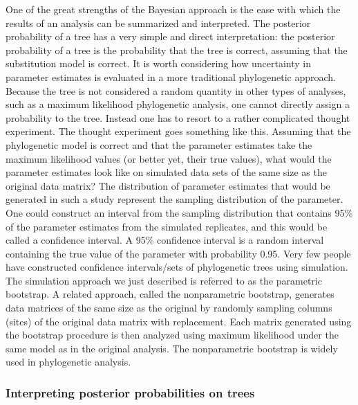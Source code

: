 \documentclass{svmult}
\begin{document}
One of the great strengths of the Bayesian approach is the ease with which the results of an analysis can be summarized and interpreted. The posterior
probability of a tree has a very simple and direct interpretation: the posterior probability of a tree is the probability that the tree is correct, assuming that
the substitution model is correct. 
It is worth considering how uncertainty in parameter estimates is evaluated in a more traditional phylogenetic approach. Because the tree is not considered
a random quantity in other types of analyses, such as a maximum likelihood phylogenetic analysis, one cannot directly assign a probability to the tree.
Instead one has to resort to a rather complicated thought experiment. The thought experiment goes something like this. Assuming that the phylogenetic
model is correct and that the parameter estimates take the maximum likelihood values (or better yet, their true values), what would the parameter estimates look like on simulated data sets
of the same size as the original data matrix? The distribution of parameter estimates that would be generated in such a study represent the sampling
distribution of the parameter. One could construct an interval from the sampling distribution that contains 95\% of the parameter estimates from the simulated replicates, and this
would be called a confidence interval. A 95\% confidence interval is a random interval containing the true value of the parameter with probability
0.95. Very few people have constructed confidence intervals/sets of phylogenetic trees using simulation. The simulation approach we just described
is referred to as the parametric bootstrap. 
A related approach, called the nonparametric bootstrap, generates data matrices of the same size as the original by randomly sampling columns (sites) of the original data matrix with replacement. Each matrix generated using the bootstrap procedure is then analyzed using maximum likelihood under the same model as
in the original analysis. The nonparametric bootstrap is widely used in phylogenetic analysis.

\subsubsection{Interpreting posterior probabilities on trees}
\end{document}
